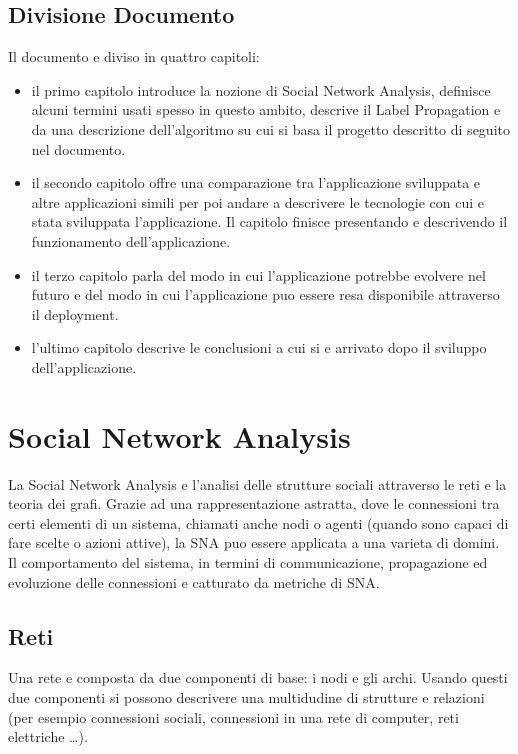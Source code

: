 \documentclass[a4paper,12pt]{report}
\begin{document}
\section{Divisione Documento}
Il documento e diviso in quattro capitoli:
\begin{itemize}
\item il primo capitolo introduce la nozione di Social Network Analysis, definisce alcuni termini usati spesso in questo ambito, descrive il Label Propagation e da una descrizione dell'algoritmo su cui si basa il progetto descritto di seguito nel documento.

\item il secondo capitolo offre una comparazione tra l'applicazione sviluppata e altre applicazioni simili per poi andare a descrivere le tecnologie con cui e stata sviluppata l'applicazione. Il capitolo finisce presentando e descrivendo il funzionamento dell'applicazione.

\item il terzo capitolo parla del modo in cui l'applicazione potrebbe evolvere nel futuro e del modo in cui l'applicazione puo essere resa disponibile attraverso il deployment.

\item l'ultimo capitolo descrive le conclusioni a cui si e arrivato dopo il sviluppo dell'applicazione.

\end{itemize}
%

\chapter{Social Network Analysis}
	La Social Network Analysis e l'analisi delle strutture sociali attraverso le reti e la teoria dei grafi. \cite{snaintro}
	Grazie ad una rappresentazione astratta, dove le connessioni tra certi elementi di un sistema, chiamati anche nodi o agenti (quando sono capaci di fare scelte o azioni attive), la SNA puo essere applicata a una varieta di domini. Il comportamento del sistema, in termini di communicazione, propagazione ed evoluzione delle connessioni e catturato da metriche di SNA. \cite{avpra}

	\section{Reti}
	Una rete e composta da due componenti di base: i nodi e gli archi. Usando questi due componenti si possono descrivere una multidudine di strutture e relazioni (per esempio connessioni sociali, connessioni in una rete di computer, reti elettriche \dots). 
\end{document}

